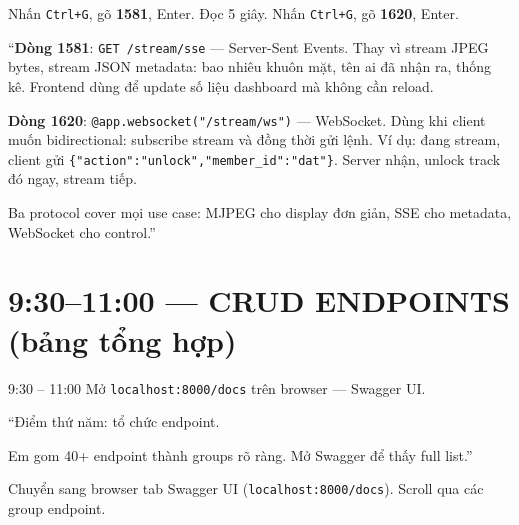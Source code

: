 \documentclass[12pt, a4paper]{article}
\begin{document}
\begin{doact}
Nhấn \texttt{Ctrl+G}, gõ \textbf{1581}, Enter. Đọc 5 giây. Nhấn \texttt{Ctrl+G}, gõ \textbf{1620}, Enter.
\end{doact}

\begin{say}
``\textbf{Dòng 1581}: \texttt{GET /stream/sse} --- Server-Sent Events.
Thay vì stream JPEG bytes, stream JSON metadata: bao nhiêu khuôn mặt, tên ai đã nhận ra, thống kê.
Frontend dùng để update số liệu dashboard mà không cần reload.

\textbf{Dòng 1620}: \texttt{@app.websocket("/stream/ws")} --- WebSocket.
Dùng khi client muốn bidirectional: subscribe stream và đồng thời gửi lệnh.
Ví dụ: đang stream, client gửi \texttt{\{"action":"unlock","member\_id":"dat"\}}.
Server nhận, unlock track đó ngay, stream tiếp.

Ba protocol cover mọi use case: MJPEG cho display đơn giản, SSE cho metadata, WebSocket cho control.''
\end{say}

\section{9:30--11:00 --- CRUD ENDPOINTS (bảng tổng hợp)}

\begin{timing}{9:30 -- 11:00}
Mở \texttt{localhost:8000/docs} trên browser --- Swagger UI.
\end{timing}

\begin{say}
``Điểm thứ năm: tổ chức endpoint.

Em gom 40+ endpoint thành groups rõ ràng.
Mở Swagger để thấy full list.''
\end{say}

\begin{doact}
Chuyển sang browser tab Swagger UI (\texttt{localhost:8000/docs}).
Scroll qua các group endpoint.
\end{doact}
\end{document}

